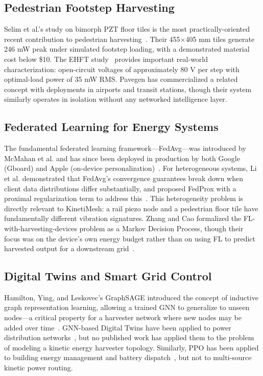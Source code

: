 \documentclass[conference]{IEEEtran}
\begin{document}
\subsection{Pedestrian Footstep Harvesting}

Selim et al.'s study on bimorph PZT floor tiles is the most practically-oriented recent contribution to pedestrian harvesting~\cite{selim2024}. Their 455$\times$405 mm tiles generate 246 mW peak under simulated footstep loading, with a demonstrated material cost below \$10. The EHFT study~\cite{ehft2021} provides important real-world characterization: open-circuit voltages of approximately 80 V per step with optimal-load power of 35 mW RMS. Pavegen has commercialized a related concept with deployments in airports and transit stations, though their system similarly operates in isolation without any networked intelligence layer.

\subsection{Federated Learning for Energy Systems}

The fundamental federated learning framework—FedAvg—was introduced by McMahan et al. and has since been deployed in production by both Google (Gboard) and Apple (on-device personalization)~\cite{mcmahan2017}. For heterogeneous systems, Li et al. demonstrated that FedAvg's convergence guarantees break down when client data distributions differ substantially, and proposed FedProx with a proximal regularization term to address this~\cite{fedprox2020}. This heterogeneity problem is directly relevant to KinetiMesh: a rail piezo node and a pedestrian floor tile have fundamentally different vibration signatures. Zhang and Cao formalized the FL-with-harvesting-devices problem as a Markov Decision Process, though their focus was on the device's own energy budget rather than on using FL to predict harvested output for a downstream grid~\cite{zhang2024}.

\subsection{Digital Twins and Smart Grid Control}

Hamilton, Ying, and Leskovec's GraphSAGE introduced the concept of inductive graph representation learning, allowing a trained GNN to generalize to unseen nodes—a critical property for a harvester network where new nodes may be added over time~\cite{graphsage2017}. GNN-based Digital Twins have been applied to power distribution networks~\cite{oraDL2025}, but no published work has applied them to the problem of modeling a kinetic energy harvester topology. Similarly, PPO has been applied to building energy management and battery dispatch~\cite{ppo2017}, but not to multi-source kinetic power routing.
\end{document}
